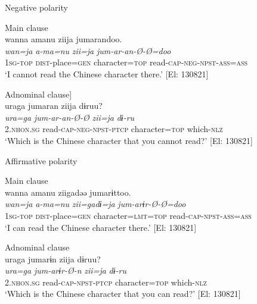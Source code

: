 \ea\label{ex:8-8}
  Negative polarity

\ea Main clause\\
\glll    wanna  amanu  ziija  jumarandoo.\\
    \textit{wan=ja}  \textit{a-ma=nu}  \textit{zii=ja}  \textit{jum-ar-an-Ø-Ø=doo}\\
    1\textsc{sg}-\textsc{top}  \textsc{dist}-place=\textsc{gen}  character=\textsc{top}  read-\textsc{cap}-\textsc{neg}-\textsc{npst}-\textsc{ass}=\textsc{ass}\\
\glt \glt ‘I cannot read the Chinese character there.’ [El: 130821]


\ex Adnominal clause]\\
\glll     uraga  jumaran  ziija  dɨruu?\\
    \textit{ura=ga}  \textit{jum-ar-an-Ø-Ø}  \textit{zii=ja}  \textit{dɨ-ru}\\
    2.\textsc{nhon}.\textsc{sg}  read-\textsc{cap}-\textsc{neg}-\textsc{npst}-\textsc{ptcp}  character=\textsc{top}  which-\textsc{nlz}\\
\glt\glt ‘Which is the Chinese character that you cannot read?’ [El: 130821]

  Affirmative polarity

\ex Main clause\\
\glll     wanna  amanu  ziigadəə  jumarɨttoo.\\
    \textit{wan=ja}  \textit{a-ma=nu}  \textit{zii=gadɨ=ja}  \textit{jum-arɨr-Ø-Ø=doo}\\
    1\textsc{sg}-\textsc{top}  \textsc{dist}-place=\textsc{gen}  character=\textsc{lmt}=\textsc{top}  read-\textsc{cap}-\textsc{npst}-\textsc{ass}=\textsc{ass}\\
\glt ‘I can read the Chinese character there.’ [El: 130821]


\ex Adnominal clause\\
\glll     uraga  jumarɨn  ziija  dɨruu?\\
    \textit{ura=ga}  \textit{jum-arɨr-Ø-n}  \textit{zii=ja}  \textit{dɨ-ru}\\
    2.\textsc{nhon}.\textsc{sg}  read-\textsc{cap}-\textsc{npst}-\textsc{ptcp}  character=\textsc{top}  which-\textsc{nlz}\\
\glt  ‘Which is the Chinese character that you can read?’ [El: 130821]
\z
\z


